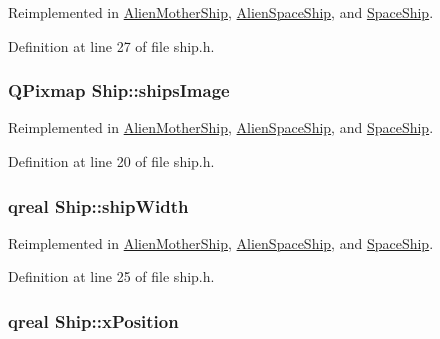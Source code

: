 Reimplemented in \hyperlink{class_alien_mother_ship_a06db4da9779e6346e7f05d3b39a8af0c}{AlienMotherShip}, \hyperlink{class_alien_space_ship_a1834c3be5efc26ca49451a3b04ec8785}{AlienSpaceShip}, and \hyperlink{class_space_ship_a53bc0fb5aa0a9b0c0d7fc70a76e1feda}{SpaceShip}.

Definition at line 27 of file ship.h.\hypertarget{class_ship_a3e61137191ddd959a57e0cd8928b4873}{
\subsubsection[{shipsImage}]{\setlength{\rightskip}{0pt plus 5cm}QPixmap {\bf Ship::shipsImage}}}
\label{class_ship_a3e61137191ddd959a57e0cd8928b4873}


Reimplemented in \hyperlink{class_alien_mother_ship_a61fef30fd35cb950ff5c23463da32adf}{AlienMotherShip}, \hyperlink{class_alien_space_ship_abab065a55af3cfac98529eeec94190f8}{AlienSpaceShip}, and \hyperlink{class_space_ship_a5bdb581da7eafb13095e97666ebe83bc}{SpaceShip}.

Definition at line 20 of file ship.h.\hypertarget{class_ship_ae57e882cf6611414d239b241f6711ba6}{
\subsubsection[{shipWidth}]{\setlength{\rightskip}{0pt plus 5cm}qreal {\bf Ship::shipWidth}}}
\label{class_ship_ae57e882cf6611414d239b241f6711ba6}


Reimplemented in \hyperlink{class_alien_mother_ship_af38d6c7fb520033527b5012f0ae60654}{AlienMotherShip}, \hyperlink{class_alien_space_ship_a752697ea2f71e8d4675c694ac242e6f9}{AlienSpaceShip}, and \hyperlink{class_space_ship_a842854c644480d337e52fa125a838cce}{SpaceShip}.

Definition at line 25 of file ship.h.\hypertarget{class_ship_a6ccec9a60696c66ede61af7397c73b3c}{
\subsubsection[{xPosition}]{\setlength{\rightskip}{0pt plus 5cm}qreal {\bf Ship::xPosition}}}
\label{class_ship_a6ccec9a60696c66ede61af7397c73b3c}


